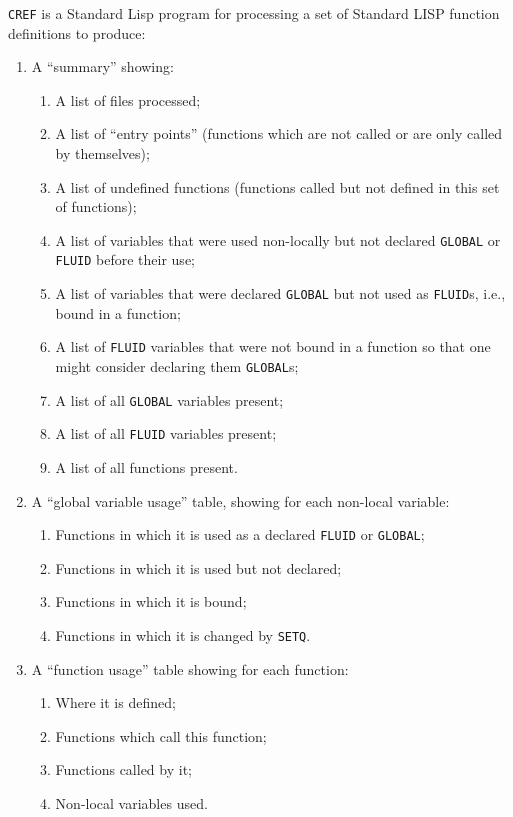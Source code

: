 \documentclass[11pt,letterpaper]{book}
\makeatletter
\newcommand{\underscore}{\_}
\newcommand{\ttindex}[1]{{\renewcommand{\_}{\protect\underscore}%
                          \index{#1@{\tt #1}}}}
\makeatother
\begin{document}
{\tt CREF}\ttindex{CREF} is a Standard Lisp program for processing a
set of Standard LISP function definitions to produce:
\begin{enumerate}
\item A ``summary'' showing:
\begin{enumerate}
\item A list of files processed;
\item A list of ``entry points'' (functions which are not called or
are only called by themselves);
\item A list of undefined functions (functions called but not
defined in this set of functions);
\item A list of variables that were used non-locally but not
declared {\tt GLOBAL} or {\tt FLUID} before their use;
\item A list of variables that were declared {\tt GLOBAL} but not used
as {\tt FLUID}s, i.e., bound in a function;
\item A list of {\tt FLUID} variables that were not bound in a function
so that one might consider declaring them {\tt GLOBAL}s;
\item A list of all {\tt GLOBAL} variables present;
\item A list of all {\tt FLUID} variables present;
\item A list of all functions present.
\end{enumerate}
\item A ``global variable usage'' table, showing for each non-local
   variable:
\begin{enumerate}
\item Functions in which it is used as a declared {\tt FLUID} or {\tt GLOBAL};
\item Functions in which it is used but not declared;
\item Functions in which it is bound;
\item Functions in which it is changed by {\tt SETQ}.
\end{enumerate}
\item A ``function usage'' table showing for each function:
\begin{enumerate}
\item Where it is defined;
\item Functions which call this function;
\item Functions called by it;
\item Non-local variables used.
\end{enumerate}
\end{enumerate}
\end{document}
